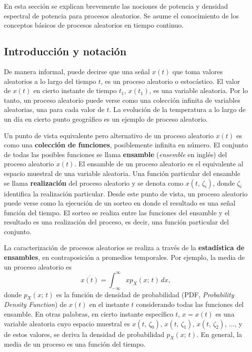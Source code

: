 \documentclass[a4paper]{article}
\begin{document}
En esta sección se explican brevemente las nociones de potencia y densidad espectral de potencia para procesos aleatorios. Se asume el conocimiento de los conceptos básicos de procesos aleatorios en tiempo continuo.

\subsection{Introducción y notación}

De manera informal, puede decirse que una señal \(x(t)\) que toma valores aleatorios a lo largo del tiempo \(t\), es un proceso aleatorio o estocástico. El valor de \(x(t)\) en cierto instante de tiempo \(t_1\), \(x(t_1)\), es una variable aleatoria. Por lo tanto, un proceso aleatorio puede verse como una colección infinita de variables aleatorias, una para cada valor de \(t\). La evolución de la temperatura a lo largo de un día en cierto punto geográfico es un ejemplo de proceso aleatorio. 

Un punto de vista equivalente pero alternativo de un proceso aleatorio \(x(t)\) es como una \textbf{colección de funciones}, posiblemente infinita en número.  El conjunto de todas las posibles funciones se llama \textbf{ensamble} (\emph{ensemble} en inglés) del proceso aleatorio \(x(t)\). El ensamble de un proceso aleatorio es el equivalente al espacio muestral de una variable aleatoria. Una función particular del ensamble se llama \textbf{realización} del proceso aleatorio y se denota como \(x(t,\,\zeta_i)\), donde \(\zeta_i\) identifica la realización particular. Desde este punto de vista, un proceso aleatorio puede verse como la ejecución de un sorteo en donde el resultado es una señal función del tiempo. El sorteo se realiza entre las funciones del ensamble y el resultado es una realización del proceso, es decir, una función particular del conjunto.

La caracterización de procesos aleatorios se realiza a través de la \textbf{estadística de ensambles}, en contraposición a promedios temporales. Por ejemplo, la media de un proceso aleatorio es
\[
 \overline{x(t)}=\int_{-\infty}^{\infty}xp_X(x;\,t)\,dx,
\]
donde \(p_X(x;\,t)\) es la función de densidad de probabilidad (PDF, \emph{Probability Density Function}) de \(x(t)\) en el instante \(t\) considerando todas las funciones del ensamble. En otras palabras, en cierto instante específico \(t\), \(x=x(t)\) es una variable aleatoria cuyo espacio muestral es  \(x(t,\,\zeta_0),\,x(t,\,\zeta_1),\,x(t,\,\zeta_2),\,\dots\), y de estos valores, se deriva la densidad de probabilidad \(p_X(x;\,t)\). En general, la media de un proceso es una función del tiempo.
\end{document}
